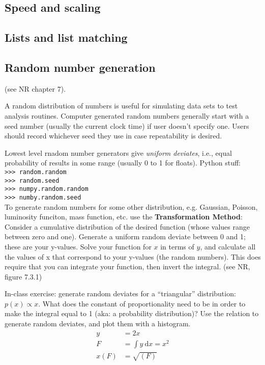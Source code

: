 \documentclass[12pt]{article}
\begin{document}
\subsection{Speed and scaling}
\subsection{Lists and list matching}
\subsection{Random number generation}
(see NR chapter 7).

A random distribution of numbers is useful for simulating data sets to test
analysis routines. Computer generated random numbers generally start with a seed
number (usually the current clock time) if user doesn't specify one. Users should
record whichever seed they use in case repeatability is desired.

Lowest level rnadom number generators give \emph{uniform deviates}, i.e., equal
probability of results in some range (usually 0 to 1 for floats).
Python stuff: \\
\texttt{>>> random.random \\
>>> random.seed \\
>>> numpy.random.random \\
>>> numby.random.seed} \\

To generate random numbers for some other distribution, e.g. Gaussian, Poisson,
luminosity funciton, mass function, etc. use the \textbf{Transformation Method}:
Consider a cumulative distribution of the desired function (whose values range
between zero and one). Generate a uniform random deviate between 0 and 1; these
are your y-values. Solve your function for $x$ in terms of $y$, and calculate
all the values of x that correspond to your y-values (the random numbers). This
does require that you can integrate your function, then invert the integral.
(see NR, figure 7.3.1)

In-class exercise: generate random deviates for a ``triangular'' distribution:
$p(x) \propto x$. What does the constant of proportionality need to be in order
to make the integral equal to 1 (aka: a probability distribution)? Use the
relation to generate random deviates, and plot them with a histogram.
\begin{align*}
    y &= 2x \\
    F &= \int \! y \ \mathrm{d}x = x^2\\
    x(F) &= \sqrt{(F)} \\
\end{align*}
\end{document}
